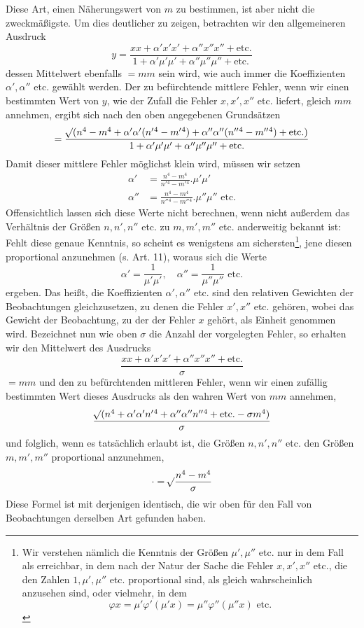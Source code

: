 Diese Art, einen Näherungswert von \(m\) zu bestimmen, ist aber nicht die zweckmäßigste. Um dies deutlicher zu zeigen, betrachten wir den allgemeineren Ausdruck
\[
y=\frac{xx+\alpha'x'x'+\alpha''x''x''+\text{etc.}}{1+\alpha'\mu'\mu'+\alpha''\mu''\mu''+\text{etc.}}
\]
dessen Mittelwert ebenfalls \(=mm\) sein wird, wie auch immer die Koeffizienten \(\alpha',\alpha''\) etc. gewählt werden. Der zu befürchtende mittlere Fehler, wenn wir einen bestimmten Wert von \(y\), wie der Zufall die Fehler \(x,x',x''\) etc. liefert, gleich \(mm\) annehmen, ergibt sich nach den oben angegebenen Grundsätzen
\[
=\frac{\mathord{{}^{}\!\surd}(n^4-m^4+\alpha'\alpha'(n'{}^4-m'{}^4)+\alpha''\alpha''(n''{}^4-m''{}^4)+\text{etc.})}{1+\alpha'\mu'\mu'+\alpha''\mu''\mu''+\text{etc.}}
\]
Damit dieser mittlere Fehler möglichst klein wird, müssen wir setzen
\[
\begin{aligned}
\alpha'&=\frac{n^4-m^4}{n'{}^4-m'{}^4}.\mu'\mu'\\[4pt]
\alpha''&=\frac{n^4-m^4}{n''{}^4-m''{}^4}.\mu''\mu''\text{ etc.}
\end{aligned}
\]
Offensichtlich lassen sich diese Werte nicht berechnen, wenn nicht außerdem das Verhältnis der Größen \(n,n',n''\) etc. zu \(m,m',m''\) etc. anderweitig bekannt ist: Fehlt diese genaue Kenntnis, so scheint es wenigstens am sichersten\footnote{Wir verstehen nämlich die Kenntnis der Größen \(\mu',\mu''\) etc. nur in dem Fall als erreichbar, in dem nach der Natur der Sache die Fehler \(x,x',x''\) etc., die den Zahlen \(1,\mu',\mu''\) etc. proportional sind, als gleich wahrscheinlich anzusehen sind, oder vielmehr, in dem
\[
\varphi x=\mu'\varphi'(\mu'x)=\mu''\varphi''(\mu''x)\text{ etc.}
\]
}, jene diesen proportional anzunehmen (s. Art. 11), woraus sich die Werte
\[
\alpha'=\frac1{\mu'\mu'},\quad\alpha''=\frac1{\mu''\mu''}\text{ etc.}
\]
ergeben. Das heißt, die Koeffizienten \(\alpha',\alpha''\) etc. sind den relativen Gewichten der Beobachtungen gleichzusetzen, zu denen die Fehler \(x',x''\) etc. gehören, wobei das Gewicht der Beobachtung, zu der der Fehler \(x\) gehört, als Einheit genommen wird. Bezeichnet nun wie oben \(\sigma\) die Anzahl der vorgelegten Fehler, so erhalten wir den Mittelwert des Ausdrucks
\[
\frac{xx+\alpha'x'x'+\alpha''x''x''+\text{etc.}}{\sigma}
\]
\(=mm\) und den zu befürchtenden mittleren Fehler, wenn wir einen zufällig bestimmten Wert dieses Ausdrucks als den wahren Wert von \(mm\) annehmen,
\[
\frac{\mathord{{}^{}\!\surd}(n^4+\alpha'\alpha'n'{}^4+\alpha''\alpha''n''{}^4+\text{etc.}-\sigma m^4)}{\sigma}
\]
und folglich, wenn es tatsächlich erlaubt ist, die Größen \(n,n',n''\) etc. den Größen \(m,m',m''\) proportional anzunehmen,
\[
\mathord{\cdot}=\mathord{{}^{}\!\surd}\frac{n^4-m^4}{\sigma}
\]
Diese Formel ist mit derjenigen identisch, die wir oben für den Fall von Beobachtungen derselben Art gefunden haben.

